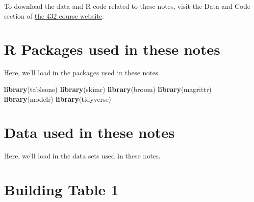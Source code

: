 \documentclass[]{book}
\newenvironment{Shaded}{\begin{snugshade}}{\end{snugshade}}
\newcommand{\KeywordTok}[1]{\textcolor[rgb]{0.13,0.29,0.53}{\textbf{#1}}}
\newcommand{\StringTok}[1]{\textcolor[rgb]{0.31,0.60,0.02}{#1}}
\newcommand{\OperatorTok}[1]{\textcolor[rgb]{0.81,0.36,0.00}{\textbf{#1}}}
\newcommand{\NormalTok}[1]{#1}
\theoremstyle{definition}
\theoremstyle{definition}
\theoremstyle{definition}
\theoremstyle{remark}
\begin{document}
To download the data and R code related to these notes, visit the Data
and Code section of \href{https://github.com/THOMASELOVE/432-2018}{the
432 course website}.

\chapter*{R Packages used in these
notes}\label{r-packages-used-in-these-notes}

Here, we'll load in the packages used in these notes.

\begin{Shaded}
\begin{Highlighting}[]
\KeywordTok{library}\NormalTok{(tableone)}
\KeywordTok{library}\NormalTok{(skimr)}
\KeywordTok{library}\NormalTok{(broom)}
\KeywordTok{library}\NormalTok{(magrittr)}
\KeywordTok{library}\NormalTok{(modelr)}
\KeywordTok{library}\NormalTok{(tidyverse)}
\end{Highlighting}
\end{Shaded}

\chapter*{Data used in these notes}\label{data-used-in-these-notes}

Here, we'll load in the data sets used in these notes.

\begin{Shaded}
\end{Shaded}

\chapter{Building Table 1}\label{building-table-1}
\end{document}

